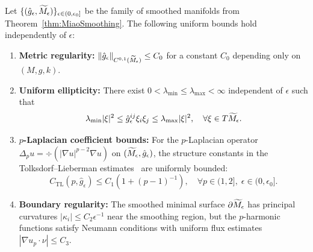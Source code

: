\begin{lemma}\label{lem:UniformEllipticityBounds}
Let $\{(\hat{g}_\epsilon, \widetilde{M}_\epsilon)\}_{\epsilon \in (0,\epsilon_0]}$ be the family of smoothed manifolds from Theorem~\ref{thm:MiaoSmoothing}. The following uniform bounds hold independently of $\epsilon$:
\begin{enumerate}
    \item \textbf{Metric regularity:} $\|\hat{g}_\epsilon\|_{C^{0,1}(\widetilde{M}_\epsilon)} \le C_0$ for a constant $C_0$ depending only on $(M,g,k)$.
    
    \item \textbf{Uniform ellipticity:} There exist $0 < \lambda_{\min} \le \lambda_{\max} < \infty$ independent of $\epsilon$ such that
    \[
    \lambda_{\min}|\xi|^2 \le \hat{g}_\epsilon^{ij}\xi_i\xi_j \le \lambda_{\max}|\xi|^2, \quad \forall \xi \in T\widetilde{M}_\epsilon.
    \]
    
    \item \textbf{$p$-Laplacian coefficient bounds:} For the $p$-Laplacian operator $\Delta_p u = \div(|\nabla u|^{p-2}\nabla u)$ on $(\widetilde{M}_\epsilon, \hat{g}_\epsilon)$, the structure constants in the Tolksdorf--Lieberman estimates~\cite{tolksdorf1984} are uniformly bounded:
    \[
    C_{\mathrm{TL}}(p, \hat{g}_\epsilon) \le C_1(1 + (p-1)^{-1}), \quad \forall p \in (1,2], \; \epsilon \in (0,\epsilon_0].
    \]
    
    \item \textbf{Boundary regularity:} The smoothed minimal surface $\partial\widetilde{M}_\epsilon$ has principal curvatures $|\kappa_i| \le C_2\epsilon^{-1}$ near the smoothing region, but the $p$-harmonic functions satisfy Neumann conditions with uniform flux estimates $|\nabla u_p \cdot \nu| \le C_3$.
\end{enumerate}
\end{lemma}

